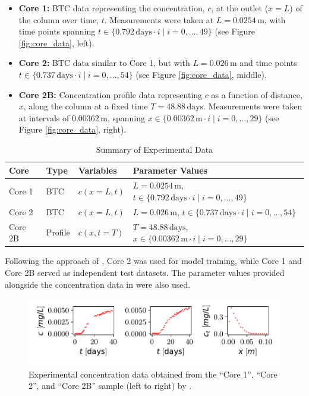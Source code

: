 \begin{itemize}
    \item \textbf{Core 1:} BTC data representing the concentration, $c$, at the outlet ($x = L$) of the column over time, $t$. Measurements were taken at $L = 0.0254\,\text{m}$, with time points spanning $t \in \{0.792\,\text{days} \cdot i \mid i = 0, \dots, 49\}$ (see Figure \vref{fig:core_data}, left).
    \item \textbf{Core 2:} BTC data similar to Core 1, but with $L = 0.026\,\text{m}$ and time points $t \in \{0.737\,\text{days} \cdot i \mid i = 0, \dots, 54\}$ (see Figure \vref{fig:core_data}, middle).
    \item \textbf{Core 2B:} Concentration profile data representing $c$ as a function of distance, $x$, along the column at a fixed time $T = 48.88\,\text{days}$. Measurements were taken at intervals of $0.00362\,\text{m}$, spanning $x \in \{0.00362\,\text{m} \cdot i \mid i = 0, \dots, 29\}$ (see Figure \vref{fig:core_data}, right).
\end{itemize}

\begin{table}[h!]
    \centering
    \caption{Summary of Experimental Data}
    \label{tab:experimental_data}
    \begin{tabular}{llll}
        \toprule
        Core   & Type       & Variables                 & Parameter Values                                      \\
        \midrule
        Core 1 & BTC        & $c(x=L, t)$              & $L = 0.0254\,\text{m}$, $t \in \{0.792\,\text{days} \cdot i \mid i = 0, \dots, 49\}$ \\
        Core 2 & BTC        & $c(x=L, t)$              & $L = 0.026\,\text{m}$, $t \in \{0.737\,\text{days} \cdot i \mid i = 0, \dots, 54\}$  \\
        Core 2B & Profile    & $c(x, t=T)$              & $T = 48.88\,\text{days}$, $x \in \{0.00362\,\text{m} \cdot i \mid i = 0, \dots, 29\}$ \\
        \bottomrule
    \end{tabular}
\end{table}

Following the approach of \cite{finn}, Core 2 was used for model training, while Core 1 and Core 2B served as independent test datasets. The parameter values provided alongside the concentration data in \cite{nowak2016entropy} were also used.


\begin{figure}[h]
    \centering
    \includegraphics{figs/core_data.pdf}
    \caption{Experimental concentration data obtained from the ``Core 1'', ``Core 2'', and ``Core 2B'' sample (left to right) by \cite{nowak2016entropy}.}
    \label{fig:core_data}
\end{figure}



